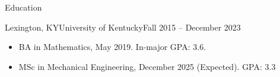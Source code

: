 \documentclass[]{mcdowellcv}
\begin{document}
\begin{cvsection}{Education}
  \begin{cvsubsection}{Lexington, KY}{University of Kentucky}{Fall 2015 -- December 2023}
    \begin{itemize}
      \item BA in Mathematics, May 2019. In-major GPA: 3.6.
      \item MSc in Mechanical Engineering, December 2025 (Expected). GPA: 3.3
    \end{itemize}
  \end{cvsubsection}
\end{cvsection}
\end{document}
